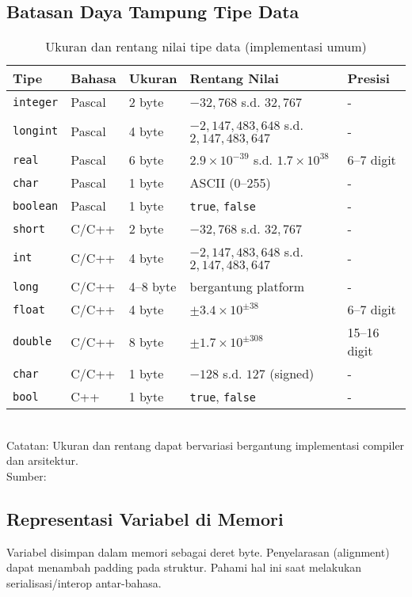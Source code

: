\documentclass[../main.tex]{subfiles}
\begin{document}
\subsection{Batasan Daya Tampung Tipe Data}
\begin{table}[H]
  \centering
  \caption{Ukuran dan rentang nilai tipe data (implementasi umum)}
  \begin{tabular}{@{}lllll@{}}
    \toprule
    Tipe & Bahasa & Ukuran & Rentang Nilai & Presisi \\
    \midrule
    \texttt{integer} & Pascal & 2 byte & $-32{,}768$ s.d. $32{,}767$ & - \\
    \texttt{longint} & Pascal & 4 byte & $-2{,}147{,}483{,}648$ s.d. $2{,}147{,}483{,}647$ & - \\
    \texttt{real} & Pascal & 6 byte & $2.9 \times 10^{-39}$ s.d. $1.7 \times 10^{38}$ & 6--7 digit \\
    \texttt{char} & Pascal & 1 byte & ASCII (0--255) & - \\
    \texttt{boolean} & Pascal & 1 byte & \texttt{true}, \texttt{false} & - \\
    \midrule
    \texttt{short} & C/C++ & 2 byte & $-32{,}768$ s.d. $32{,}767$ & - \\
    \texttt{int} & C/C++ & 4 byte & $-2{,}147{,}483{,}648$ s.d. $2{,}147{,}483{,}647$ & - \\
    \texttt{long} & C/C++ & 4--8 byte & bergantung platform & - \\
    \texttt{float} & C/C++ & 4 byte & $\pm 3.4 \times 10^{\pm 38}$ & 6--7 digit \\
    \texttt{double} & C/C++ & 8 byte & $\pm 1.7 \times 10^{\pm 308}$ & 15--16 digit \\
    \texttt{char} & C/C++ & 1 byte & $-128$ s.d. $127$ (signed) & - \\
    \texttt{bool} & C++ & 1 byte & \texttt{true}, \texttt{false} & - \\
    \bottomrule
  \end{tabular}
  \\Catatan: Ukuran dan rentang dapat bervariasi bergantung implementasi compiler dan arsitektur.
  \\Sumber: \parencite{free-pascal-docs,iso-c-draft-n1570,cpp-fundamental-types}
\end{table}

\subsection{Representasi Variabel di Memori}
Variabel disimpan dalam memori sebagai deret byte. Penyelarasan (alignment) dapat menambah padding pada struktur. Pahami hal ini saat melakukan serialisasi/interop antar-bahasa.
\end{document}
